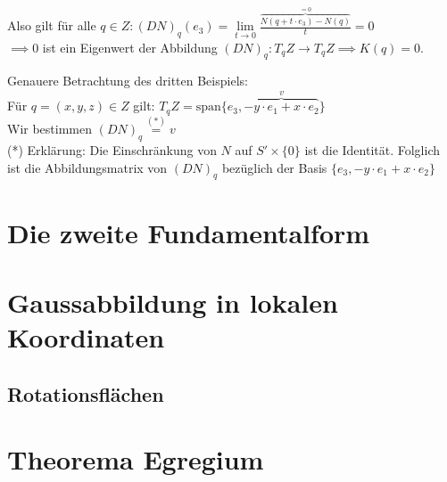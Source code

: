 \documentclass[../main.tex]{subfiles}
\begin{document}
\begin{example}
\begin{enumerate}
        Also gilt für alle $q \in Z : (DN)_{q}(e_{3}) = \lim\limits_{t \rightarrow 0}{\frac{\overbrace{N(q + t \cdot e_{3}) - N(q)}^{=0}}{t}} = 0$\\
        $\implies 0$ ist ein Eigenwert der Abbildung $(DN)_{q} : T_{q}Z \to T_{q}Z \implies K(q) = 0$.
    \end{enumerate}
    \begin{zusatz}
        Genauere Betrachtung des dritten Beispiels:\\
        Für $q = (x,y,z) \in Z$ gilt: $T_{q}Z = \text{span}\{e_{3}, \overbrace{-y \cdot e_{1} + x \cdot e_{2}}^{v}\}$\\
        Wir bestimmen $(DN)_{q}\stackrel{(\text{*})}{=} v$\\
        (*) Erklärung: Die Einschränkung von $N$ auf $S'\times \{0\}$ ist die Identität. Folglich ist die Abbildungsmatrix von $(DN)_{q}$ bezüglich der Basis $\{ e_{3}, -y \cdot e_{1} + x \cdot e_{2} \}$
    \end{zusatz}
   
\end{example}

\section{Die zweite Fundamentalform}

\section{Gaussabbildung in lokalen Koordinaten}
\subsection*{Rotationsflächen}

\section{Theorema Egregium}
\end{document}
